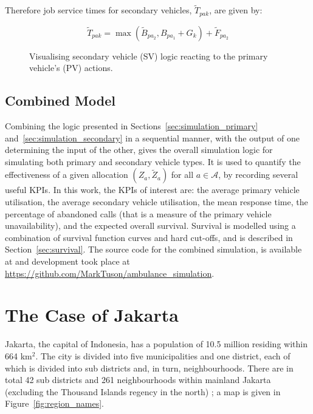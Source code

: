 \documentclass[preprint,12pt]{elsarticle}
\begin{document}
Therefore job service times for secondary vehicles, $\tilde{T}_{pak}$, are
given by:

\begin{equation}
  \tilde{T}_{pak} = \max\left(\tilde{B}_{pa_2}, B_{pa_1} + G_k \right) + \tilde{F}_{pa_2}
\end{equation}

\begin{figure}
    \centering
    
    \caption{Visualising secondary vehicle (SV) logic reacting to the primary
    vehicle's (PV) actions.}
    \label{fig:sequential_logic}
\end{figure}

\subsection{Combined Model}
Combining the logic presented in Sections~\ref{sec:simulation_primary}
and~\ref{sec:simulation_secondary} in a sequential manner, with the output of
one determining the input of the other, gives the overall simulation logic for
simulating both primary and secondary vehicle types. It is used to quantify
the effectiveness of a given allocation $(Z_a, \tilde{Z}_a)$ for all
$a \in \mathcal{A}$, by recording several useful KPIs.
In this work, the KPIs of interest are: the average primary vehicle
utilisation, the average secondary vehicle utilisation, the mean response
time, the percentage of abandoned calls (that is a measure of the primary
vehicle unavailability), and the expected overall survival. Survival is
modelled using a combination of survival function curves and hard cut-offs,
and is described in Section~\ref{sec:survival}.
The source code for the combined simulation, is available at \cite{zenodo_sim} and
development took place at \url{https://github.com/MarkTuson/ambulance_simulation}.




\section{The Case of Jakarta}\label{sec:jakarta}
Jakarta, the capital of Indonesia, has a population of 10.5 million
\cite{BPS_Jakarta} residing within 664 km$^2$. The city is divided into five
municipalities and one district, each of which is divided into sub districts
and, in turn, neighbourhoods. There are in total 42 sub districts and 261
neighbourhoods within mainland Jakarta (excluding the Thousand Islands regency
in the north) \cite{BPS_Jakarta_angka}; a map is given in
Figure~\ref{fig:region_names}. 
\end{document}
